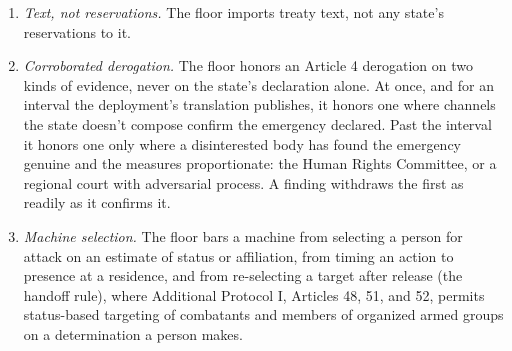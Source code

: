 \begin{enumerate}
\item[1.] \emph{Text, not reservations.} The floor imports treaty text, not any state's reservations to it.
\item[2.] \emph{Corroborated derogation.} The floor honors an Article 4 derogation on two kinds of evidence, never on the state's declaration alone. At once, and for an interval the deployment's translation publishes, it honors one where channels the state doesn't compose confirm the emergency declared. Past the interval it honors one only where a disinterested body has found the emergency genuine and the measures proportionate: the Human Rights Committee, or a regional court with adversarial process. A finding withdraws the first as readily as it confirms it.
\item[3.] \emph{Machine selection.} The floor bars a machine from selecting a person for attack on an estimate of status or affiliation, from timing an action to presence at a residence, and from re-selecting a target after release (the handoff rule), where Additional Protocol I, Articles 48, 51, and 52, permits status-based targeting of combatants and members of organized armed groups on a determination a person makes.
\end{enumerate}


